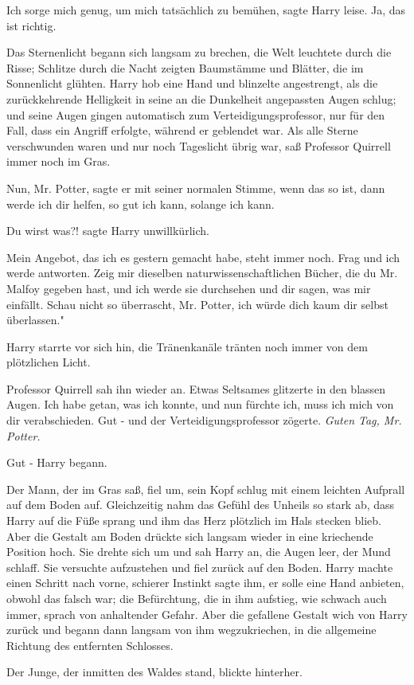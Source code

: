 \glqq{}Ich sorge mich genug, um mich tatsächlich zu bemühen\grqq{}, sagte Harry
leise. \glqq{}Ja, das ist richtig.\grqq{}

Das Sternenlicht begann sich langsam zu brechen, die Welt leuchtete durch die
Risse; Schlitze durch die Nacht zeigten Baumstämme und Blätter, die im
Sonnenlicht glühten. Harry hob eine Hand und blinzelte angestrengt, als die
zurückkehrende Helligkeit in seine an die Dunkelheit angepassten Augen schlug;
und seine Augen gingen automatisch zum Verteidigungsprofessor, nur für den Fall,
dass ein Angriff erfolgte, während er geblendet war. Als alle Sterne
verschwunden waren und nur noch Tageslicht übrig war, saß Professor Quirrell
immer noch im Gras.

\glqq{}Nun, Mr. Potter\grqq{}, sagte er mit seiner normalen Stimme, \glqq{}wenn
das so ist, dann werde ich dir helfen, so gut ich kann, solange ich kann.\grqq{}

\glqq{}Du wirst was?!\grqq{} sagte Harry unwillkürlich.

\glqq{}Mein Angebot, das ich es gestern gemacht habe, steht immer noch. Frag und
ich werde antworten. Zeig mir dieselben naturwissenschaftlichen Bücher, die du
Mr. Malfoy gegeben hast, und ich werde sie durchsehen und dir sagen, was mir
einfällt. Schau nicht so überrascht, Mr. Potter, ich würde dich kaum dir selbst
überlassen."

Harry starrte vor sich hin, die Tränenkanäle tränten noch immer von dem
plötzlichen Licht.

Professor Quirrell sah ihn wieder an. Etwas Seltsames glitzerte in den blassen
Augen. \glqq{}Ich habe getan, was ich konnte, und nun fürchte ich, muss ich mich
von dir verabschieden. Gut -\grqq{} und der Verteidigungsprofessor zögerte.
\glqq{}\emph{Guten Tag, Mr. Potter.}\grqq{}

\glqq{}Gut -\grqq{} Harry begann.

Der Mann, der im Gras saß, fiel um, sein Kopf schlug mit einem leichten Aufprall
auf dem Boden auf. Gleichzeitig nahm das Gefühl des Unheils so stark ab, dass
Harry auf die Füße sprang und ihm das Herz plötzlich im Hals stecken blieb. Aber
die Gestalt am Boden drückte sich langsam wieder in eine kriechende Position
hoch. Sie drehte sich um und sah Harry an, die Augen leer, der Mund schlaff. Sie
versuchte aufzustehen und fiel zurück auf den Boden. Harry machte einen Schritt
nach vorne, schierer Instinkt sagte ihm, er solle eine Hand anbieten, obwohl das
falsch war; die Befürchtung, die in ihm aufstieg, wie schwach auch immer, sprach
von anhaltender Gefahr. Aber die gefallene Gestalt wich von Harry zurück und
begann dann langsam von ihm wegzukriechen, in die allgemeine Richtung des
entfernten Schlosses.

Der Junge, der inmitten des Waldes stand, blickte hinterher.

